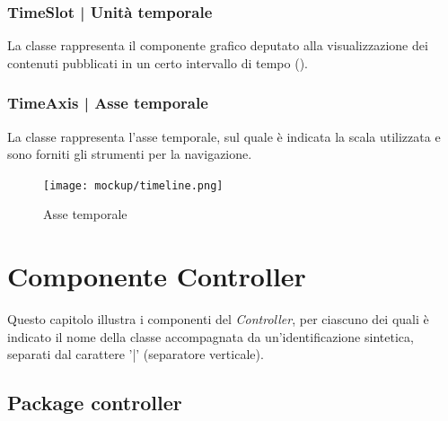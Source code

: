 \documentclass[10pt,a4paper,headinclude,footinclude,hidelinks]{scrreprt} %
\begin{document}
	\subsection[TimeSlot]{TimeSlot | Unità temporale}
	\label{sec:stage:design:view.timeline:time-slot}
	La classe \textit{} rappresenta il componente grafico deputato alla visualizzazione dei contenuti pubblicati in un certo intervallo di tempo (\textit{}).

	\subsection[TimeAxis]{TimeAxis | Asse temporale}
	\label{sec:stage:design:view.timeline:time-axis}
	La classe \textit{} rappresenta l'asse temporale, sul quale è indicata la scala utilizzata e sono forniti gli strumenti per la navigazione.

	\begin{figure}[ht]
		\begin{center}
	    	\texttt{[image: mockup/timeline.png]}
			\label{gfx:mockup:timeline:axis}
			\caption{Asse temporale}
		\end{center}
	\end{figure}

	\chapter{Componente Controller}
	\label{ch:stage:design:controller}


	Questo capitolo illustra i componenti del \textit{Controller}, per ciascuno dei quali è indicato il nome della classe accompagnata da un'identificazione sintetica, separati dal carattere '|' (separatore verticale).

	\section{Package controller}
	\label{sec:stage:design:controller}
\end{document}
